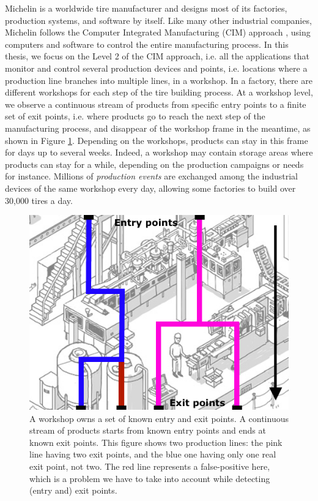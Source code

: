 Michelin is a worldwide tire manufacturer and designs most of its
factories, production systems, and software by itself.  Like
many other industrial companies, Michelin follows the Computer
Integrated Manufacturing (CIM) approach \cite{rehg2004computer},
using computers and software to control the entire manufacturing
process. In this thesis, we focus on the Level 2 of the CIM
approach, i.e. all the applications that monitor and control
several production devices and points, i.e. locations where a
production line branches into multiple lines, in a workshop. In a
factory, there are different workshops for each step of the tire
building process. At a workshop level, we observe a continuous
stream of products from specific entry points to a finite set of
exit points, i.e. where products go to reach the next step of the
manufacturing process, and disappear of the workshop frame in the
meantime, as shown in Figure \ref{fig:workshop-annotated}.
Depending on the workshops, products can stay in this frame for
days up to several weeks.  Indeed, a workshop may contain storage
areas where products can stay for a while, depending on the
production campaigns or needs for instance.  Millions of
\emph{production events} are exchanged among the industrial
devices of the same workshop every day, allowing some factories
to build over 30,000 tires a day.

\begin{figure}[ht]
    \includegraphics[width=1.0\linewidth]{figures/workshop-annotated.png}

    \caption{A workshop owns a set of known entry and exit
    points.  A continuous stream of products starts from known
    entry points and ends at known exit points. This figure
    shows two production lines: the pink line having two exit
    points, and the blue one having only one real exit point,
    not two. The red line represents a false-positive here,
    which is a problem we have to take into account while
    detecting (entry and) exit points.}
    \label{fig:workshop-annotated}
\end{figure}

